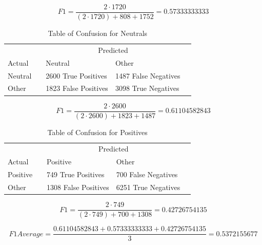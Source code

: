 \[F1 = \dfrac{2\cdot1720}{(2\cdot1720) + 808 + 1752} = 0.57333333333\]


\begin{table}[H]
	\begin{tabular}{@{}lllll@{}}
		\toprule
		& & \multicolumn{2}{c}{Predicted} \\\cmidrule{2-4}
		Actual & & Neutral & Other & \\ \midrule
		Neutral & & 2600 True Positives & 1487 False Negatives & \\
		Other  & & 1823 False Positives & 3098 True Negatives & \\ \bottomrule
	\end{tabular}
	\centering
	\caption{Table of Confusion for Neutrals}
	\label{rbneu}
\end{table}

\[F1 = \dfrac{2\cdot2600}{(2\cdot2600) + 1823 + 1487} = 0.61104582843\]


\begin{table}[H]
	\begin{tabular}{@{}lllll@{}}
		\toprule
		& & \multicolumn{2}{c}{Predicted} \\\cmidrule{2-4}
		Actual & & Positive & Other & \\ \midrule
		Positive & & 749 True Positives & 700 False Negatives & \\
		Other  & & 1308 False Positives & 6251 True Negatives & \\ \bottomrule
	\end{tabular}
	\centering
	\caption{Table of Confusion for Positives}
	\label{rbpos}
\end{table}


\[F1 = \dfrac{2\cdot749}{(2\cdot749) + 700 + 1308} = 0.42726754135\]

\[F1 Average = \dfrac{0.61104582843 + 0.57333333333 + 0.42726754135}{3} = 0.5372155677\]